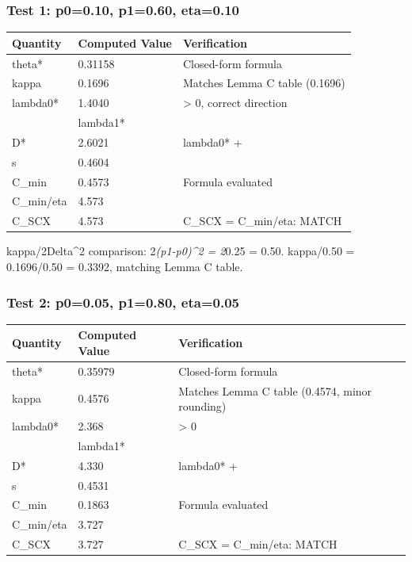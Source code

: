\documentclass[
  12pt,
]{article}
\begin{document}
\subsubsection{Test 1: p0=0.10, p1=0.60,
eta=0.10}\label{test-1-p00.10-p10.60-eta0.10}

\begin{longtable}[]{@{}lll@{}}
\toprule\noalign{}
Quantity & Computed Value & Verification \\
\midrule\noalign{}
\endhead
\bottomrule\noalign{}
\endlastfoot
theta* & 0.31158 & Closed-form formula \\
kappa & 0.1696 & Matches Lemma C table (0.1696) \\
lambda0* & 1.4040 & \textgreater{} 0, correct direction \\
& lambda1* & \\
D* & 2.6021 & lambda0* + \\
s & 0.4604 & \\
C\_min & 0.4573 & Formula evaluated \\
C\_min/eta & 4.573 & \\
C\_SCX & 4.573 & C\_SCX = C\_min/eta: MATCH \\
\end{longtable}

kappa/2Delta\^{}2 comparison: 2\emph{(p1-p0)\^{}2 = 2}0.25 = 0.50.
kappa/0.50 = 0.1696/0.50 = 0.3392, matching Lemma C table.

\subsubsection{Test 2: p0=0.05, p1=0.80,
eta=0.05}\label{test-2-p00.05-p10.80-eta0.05}

\begin{longtable}[]{@{}lll@{}}
\toprule\noalign{}
Quantity & Computed Value & Verification \\
\midrule\noalign{}
\endhead
\bottomrule\noalign{}
\endlastfoot
theta* & 0.35979 & Closed-form formula \\
kappa & 0.4576 & Matches Lemma C table (0.4574, minor rounding) \\
lambda0* & 2.368 & \textgreater{} 0 \\
& lambda1* & \\
D* & 4.330 & lambda0* + \\
s & 0.4531 & \\
C\_min & 0.1863 & Formula evaluated \\
C\_min/eta & 3.727 & \\
C\_SCX & 3.727 & C\_SCX = C\_min/eta: MATCH \\
\end{longtable}
\end{document}
